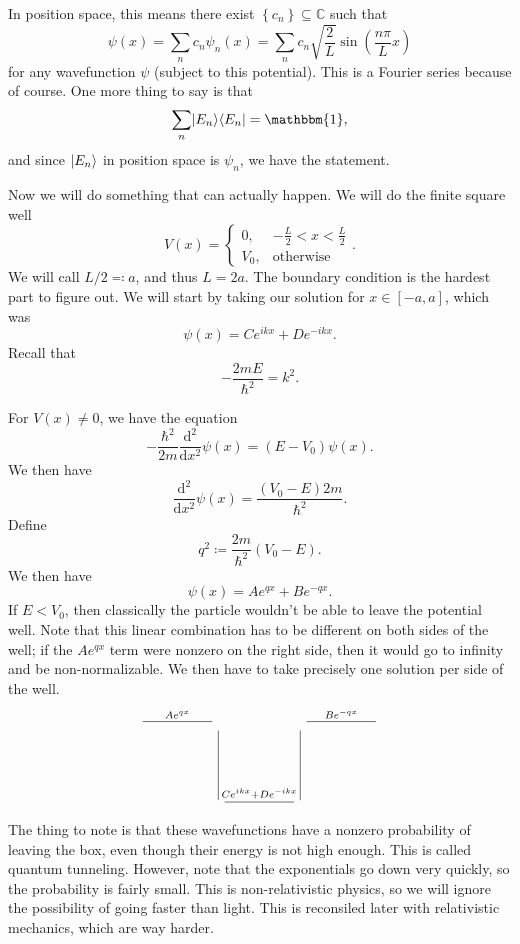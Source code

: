 
In position space, this means there exist $\left\{ c_n \right\} \subseteq \mathbb{C} $ such that
\[
	\psi \left(x \right) =\sum_{n} c_n \psi _n(x)=\sum_{n} c_n \sqrt{\frac{2}{L} } \sin \left( \frac{n\pi }{L} x \right) 
\]
for any wavefunction $\psi $ (subject to this potential). This is a Fourier series because of course. One more thing to say is that
\[
	\sum_{n} \ket{E_n} \bra{E_n} =\mathbbm{1},
\]
and since $\lvert E_n\rangle $ in position space is $\psi _n$, we have the statement.

Now we will do something that can actually happen. We will do the finite square well
\[
	V(x)=
	\begin{cases}
		0,&-\frac{L}{2} <x<\frac{L}{2} \\
		V_0,&\text{otherwise} 
	\end{cases}
.\]
We will call $L/2\eqqcolon a$, and thus $L=2a$. The boundary condition is the hardest part to figure out. We will start by taking our solution for $x\in[-a,a]$, which was
\[
	\psi(x)=Ce^{ikx} +De^{-ikx} 
.\]
Recall that
\[
	-\frac{2mE}{\hbar ^2} =k^2
.\]

For $V(x)\neq 0$, we have the equation
\[
	-\frac{\hbar ^2}{2m} \frac{\mathrm{d}^2}{\mathrm{d}x^2} \psi (x)=(E-V_0)\psi (x)
.\]
We then have
\[
	\frac{\mathrm{d}^2}{\mathrm{d}x^2} \psi (x)=\frac{(V_0-E)2m}{\hbar ^2} 
.\]
Define
\[
	q^2\coloneqq \frac{2m}{\hbar ^2} (V_0-E)
.\]
We then have
\[
	\psi (x)=Ae^{qx} +Be^{-qx} 
.\]
If $E<V_0$, then classically the particle wouldn't be able to leave the potential well. Note that this linear combination has to be different on both sides of the well; if the $Ae^{qx} $ term were nonzero on the right side, then it would go to infinity and be non-normalizable. We then have to take precisely one solution per side of the well.
\[\begin{tikzcd}[row sep = 5em, column sep = 5em]
	{}\ar[r, dash, "Ae^{qx} "]&{}\ar[d, dash]&{}\ar[d, dash]\ar[r, dash, "Be^{-qx} "]&{}\\
				  &{}\ar[r, dash, "Ce^{ikx} +De^{-ikx} "]&{}
\end{tikzcd}\]
The thing to note is that these wavefunctions have a nonzero probability of leaving the box, even though their energy is not high enough. This is called quantum tunneling. However, note that the exponentials go down very quickly, so the probability is fairly small. This is non-relativistic physics, so we will ignore the possibility of going faster than light. This is reconsiled later with relativistic mechanics, which are way harder.

